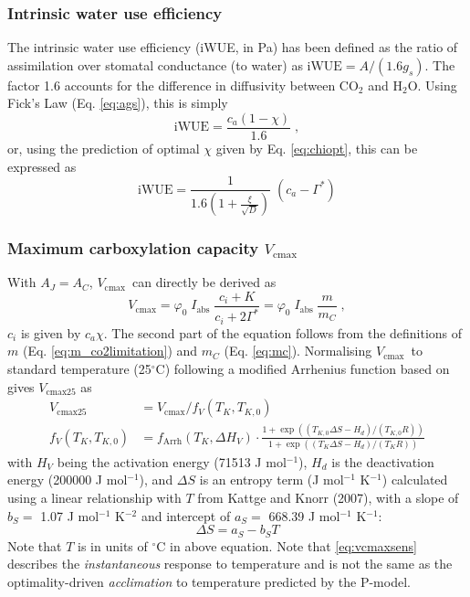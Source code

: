\documentclass{myreport}
\newcommand{\vcmax}{$V_{\text{cmax}}$}
\begin{document}

\subsubsection{Intrinsic water use efficiency}
The intrinsic water use efficiency (iWUE, in Pa) has been defined as the ratio of assimilation over stomatal conductance (to water) \citep{beer09gbc} as $\text{iWUE} = A / (1.6 g_s)$. The factor 1.6 accounts for the difference in diffusivity between CO$_2$ and H$_2$O. Using Fick's Law (Eq. \ref{eq:ags}), this is simply
\begin{equation}
\label{eq:iwue}
    \mathrm{iWUE} = \frac{c_a (1-\chi)}{1.6} \;,
\end{equation}
or, using the prediction of optimal $\chi$ given by Eq. \ref{eq:chiopt}, this can be expressed as
\begin{equation}
    \text{iWUE} = \frac{1}{1.6 \left( 1+ \frac{\xi}{\sqrt{D}} \right) }\; (c_a - \Gamma^\ast)
\end{equation}

\subsubsection{Maximum carboxylation capacity
\label{sec:vcmax}
$V_{\mathrm{cmax}}$}
With $A_J=A_C$, \vcmax\ can directly be derived as 
\begin{equation}
    \label{eq:vcmax}
    V_{\mathrm{cmax}} = \varphi_0\;I_{\mathrm{abs}}\;\frac{c_i + K}{c_i + 2\Gamma^\ast} = \varphi_0\;I_{\mathrm{abs}}\; \frac{m}{m_C}\;,
\end{equation}
$c_i$ is given by $c_a \chi$. The second part of the equation follows from the definitions of $m$ (Eq. \ref{eq:m_co2limitation}) and $m_C$ (Eq. \ref{eq:mc}). Normalising \vcmax\ to standard temperature (25$^{\circ}$C) following a modified Arrhenius function based on \citet{kattge07} gives $V_{\mathrm{cmax25}}$ as
\begin{align}
    \label{eq:vcmax25}
    V_{\mathrm{cmax25}} &= V_{\mathrm{cmax}} / f_V (T_K, T_{K,0}) \\ 
    \label{eq:vcmaxsens}
    f_V (T_K, T_{K,0}) &= f_{\text{Arrh}}(T_K, \Delta H_V) \cdot \frac{1+\exp( (T_{K,0}\Delta S-H_d) / (T_{K,0} R) )}{1+\exp( (T_K\Delta S - H_d)/(T_K R) )}
\end{align}
with $H_V$ being the activation energy (71513 J mol$^{-1}$), $H_d$ is the deactivation energy (200000 J mol$^{-1}$), and $\Delta S$ is an entropy term (J mol$^{-1}$ K$^{-1}$) calculated using a linear relationship with $T$ from Kattge and Knorr (2007), with a slope of $b_S =$ 1.07 J mol$^{-1}$ K$^{-2}$ and intercept of $a_S = $ 668.39 J mol$^{-1}$ K$^{-1}$:
\begin{equation}
\label{eq:entropy}
    \Delta S = a_S - b_S T
\end{equation}
Note that $T$ is in units of $^{\circ}$C in above equation. Note that \ref{eq:vcmaxsens} describes the \textit{instantaneous} response to temperature and is not the same as the optimality-driven \textit{acclimation} to temperature predicted by the P-model.
\end{document}
